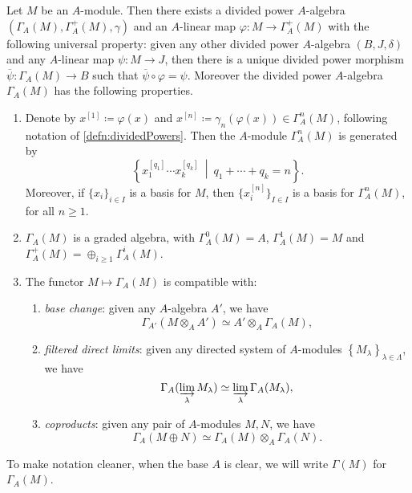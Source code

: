 \begin{thm}\label{thm:PDSymAlg}
	Let $M$ be an $A$-module.
	Then there exists a divided power \(A\)-algebra 
	$\left(\Gamma_A(M), \Gamma_A^+(M), \gamma\right)$ and an $A$-linear
	map $\varphi\colon M \to \Gamma_A^+(M)$ with the following
	universal property:
	given any other divided power \(A\)-algebra
	$\left(B, J, \delta\right)$ and any $A$-linear
	map $\psi\colon M \to J$,
	then there is a unique divided power morphism
	$\overline{\psi}\colon \Gamma_A(M) \to B$
	such that $\overline{\psi} \circ \varphi = \psi$.
	Moreover the divided power \(A\)-algebra $\Gamma_A(M)$ 
	has the following properties.
\begin{enumerate}
	\item Denote by $x^{[1]} \coloneqq \varphi(x)$ and $x^{[n]} \coloneqq \gamma_n(\varphi(x)) \in
		\Gamma_A^n(M)$, following notation of \cref{defn:dividedPowers}.
		Then the $A$-module $\Gamma_A^n(M)$ is generated by
		\begin{equation*}
		\left\{ x_1^{[q_1]} \cdots x_k^{[q_k]} \ \middle|\ 
		q_1 + \cdots + q_k = n \right\}
		.\end{equation*}
		Moreover, if $\{ x_i \}_{i \in I}$ is a basis
		for $M$, then $\{ x^{[n]}_i \}_{I \in I}$
		is a basis for $\Gamma_A^n(M)$,
		for all $n \geq 1$.

	\item $\Gamma_A(M)$ is a graded algebra, with
		$\Gamma_A^0(M) = A$, $\Gamma_A^1(M) = M$
		and $\Gamma_A^+(M) = \oplus_{i \geq 1} \Gamma_A^i(M)$.

	\item The functor $M \mapsto \Gamma_A(M)$ is compatible with:
		\begin{enumerate}
			\item \emph{base change}: given any $A$-algebra $A'$,
				we have
				\begin{equation*}
					\Gamma_{A'}(M \otimes_A A') \simeq A' \otimes_A \Gamma_A(M)
				,\end{equation*}

			\item \emph{filtered direct limits}: given any directed system
				of $A$-modules $\left\{ M_\lambda \right\}_{\lambda \in \Lambda}$, we have
				\begin{equation*}
					\Gamma_A(\varinjlim_\lambda M_\lambda) \simeq
					\varinjlim_\lambda \Gamma_A(M_\lambda)
				,\end{equation*}
				
			\item \emph{coproducts}: given any pair of $A$-modules $M,N$, we have
				\begin{equation*}
					\Gamma_A(M \oplus N) \simeq
					\Gamma_A(M) \otimes_A \Gamma_A(N)
				.\end{equation*}
		\end{enumerate}
\end{enumerate}
	To make notation cleaner, when the base $A$ is clear, we
	will write $\Gamma(M)$ for $\Gamma_A(M)$.
\end{thm}


